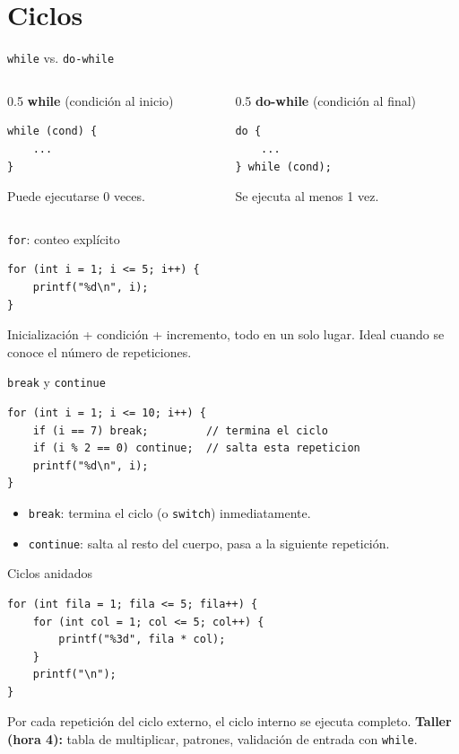 \documentclass[11pt]{beamer}
\begin{document}
\section{Ciclos}

\begin{frame}[fragile]{\texttt{while} vs. \texttt{do-while}}
  \begin{columns}
    \begin{column}{0.5\textwidth}
      \textbf{while} (condición al inicio)
\begin{lstlisting}
while (cond) {
    ...
}
\end{lstlisting}
      Puede ejecutarse 0 veces.
    \end{column}
    \begin{column}{0.5\textwidth}
      \textbf{do-while} (condición al final)
\begin{lstlisting}
do {
    ...
} while (cond);
\end{lstlisting}
      Se ejecuta al menos 1 vez.
    \end{column}
  \end{columns}
\end{frame}

\begin{frame}[fragile]{\texttt{for}: conteo explícito}
\begin{lstlisting}
for (int i = 1; i <= 5; i++) {
    printf("%d\n", i);
}
\end{lstlisting}
  Inicialización + condición + incremento, todo en un solo lugar. Ideal cuando se conoce el número
  de repeticiones.
\end{frame}

\begin{frame}[fragile]{\texttt{break} y \texttt{continue}}
\begin{lstlisting}
for (int i = 1; i <= 10; i++) {
    if (i == 7) break;         // termina el ciclo
    if (i % 2 == 0) continue;  // salta esta repeticion
    printf("%d\n", i);
}
\end{lstlisting}
  \begin{itemize}
    \item \texttt{break}: termina el ciclo (o \texttt{switch}) inmediatamente.
    \item \texttt{continue}: salta al resto del cuerpo, pasa a la siguiente repetición.
  \end{itemize}
\end{frame}

\begin{frame}[fragile]{Ciclos anidados}
\begin{lstlisting}
for (int fila = 1; fila <= 5; fila++) {
    for (int col = 1; col <= 5; col++) {
        printf("%3d", fila * col);
    }
    printf("\n");
}
\end{lstlisting}
  Por cada repetición del ciclo externo, el ciclo interno se ejecuta completo.
  \vfill
  \textbf{Taller (hora 4):} tabla de multiplicar, patrones, validación de entrada con
  \texttt{while}.
\end{frame}
\end{document}
